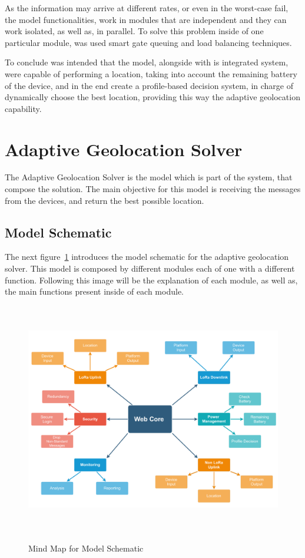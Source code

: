 As the information may arrive at different rates, or even in the worst-case fail, the model functionalities, work in modules that are independent and they can work isolated, as well as, in parallel. To solve this problem inside of one particular module, was used smart gate queuing and load balancing techniques.

To conclude was intended that the model, alongside with is integrated system, were capable of performing a location, taking into account the remaining battery of the device, and in the end create a profile-based decision system, in charge of dynamically choose the best location, providing this way the adaptive geolocation capability.





\newpage
\section{Adaptive Geolocation Solver}
The Adaptive Geolocation Solver is the model which is part of the system, that compose the solution. The main objective for this model is receiving the messages from the devices, and return the best possible location.


\label{sec:adaptive_geolocation_solver}
\subsection{Model Schematic}
The next figure~\ref{fig:Model_Schematic} introduces the model schematic for the adaptive geolocation solver.
This model is composed by different modules each of one with a different function. Following this image will be the explanation of each module, as well as, the main functions present inside of each module.

\begin{figure}[htbp]
  \centering
  
    {\includegraphics[height= 4in,width=0.92\linewidth]{Chapters/Figures/model_schematic3.pdf}}%
 
  \caption{Mind Map for Model Schematic}
  \label{fig:Model_Schematic}
\end{figure}



